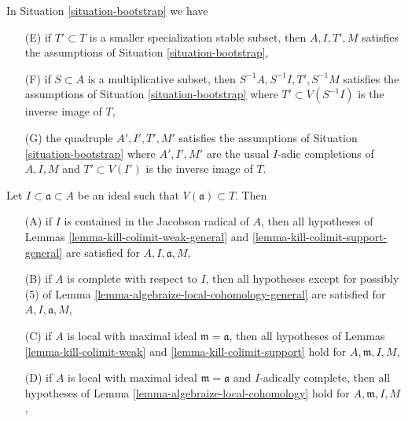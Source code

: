 \begin{lemma}
\label{lemma-bootstrap-inherited}
In Situation \ref{situation-bootstrap} we have
\begin{enumerate}
\item[(E)] if $T' \subset T$ is a smaller specialization stable subset, then
$A, I, T', M$ satisfies the assumptions of Situation \ref{situation-bootstrap},
\item[(F)] if $S \subset A$ is a multiplicative subset, then
$S^{-1}A, S^{-1}I, T', S^{-1}M$
satisfies the assumptions of Situation \ref{situation-bootstrap}
where $T' \subset V(S^{-1}I)$ is the inverse image of $T$,
\item[(G)] the quadruple $A', I', T', M'$
satisfies the assumptions of Situation \ref{situation-bootstrap}
where $A', I', M'$ are the usual $I$-adic completions of $A, I, M$
and $T' \subset V(I')$ is the inverse image of $T$.
\end{enumerate}
Let $I \subset \mathfrak a \subset A$ be an ideal such that
$V(\mathfrak a) \subset T$. Then
\begin{enumerate}
\item[(A)] if $I$ is contained in the Jacobson radical of $A$,
then all hypotheses of
Lemmas \ref{lemma-kill-colimit-weak-general} and
\ref{lemma-kill-colimit-support-general} are satisfied
for $A, I, \mathfrak a, M$,
\item[(B)] if $A$ is complete with respect to $I$, then
all hypotheses except for possibly (5) of
Lemma \ref{lemma-algebraize-local-cohomology-general}
are satisfied for $A, I, \mathfrak a, M$,
\item[(C)] if $A$ is local with maximal ideal $\mathfrak m = \mathfrak a$,
then all hypotheses of
Lemmas \ref{lemma-kill-colimit-weak} and \ref{lemma-kill-colimit-support}
hold for $A, \mathfrak m, I, M$,
\item[(D)] if $A$ is local with maximal ideal $\mathfrak m = \mathfrak a$
and $I$-adically complete, then all hypotheses of
Lemma \ref{lemma-algebraize-local-cohomology}
hold for $A, \mathfrak m, I, M$,
\end{enumerate}
\end{lemma}

